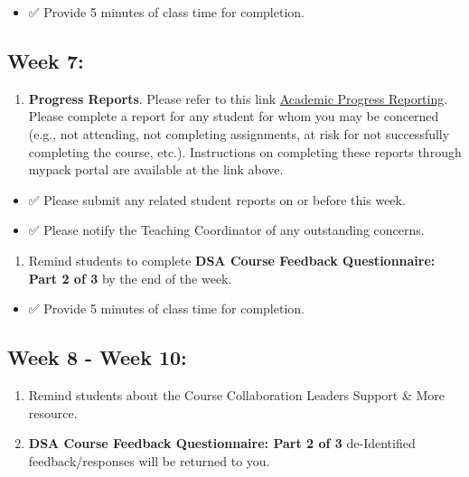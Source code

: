 \documentclass[
  letterpaper,
  DIV=11,
  numbers=noendperiod]{scrreprt}
\providecommand{\tightlist}{%
  \setlength{\itemsep}{0pt}\setlength{\parskip}{0pt}}
\begin{document}
\begin{itemize}
\tightlist
\item
  ✅ Provide 5 minutes of class time for completion.
\end{itemize}

\subsection{Week 7:}\label{week-7}

\begin{enumerate}
\def\labelenumi{\arabic{enumi})}
\tightlist
\item
  \textbf{Progress Reports}. Please refer to this link
  \href{https://dasa.ncsu.edu/faculty-resources/academic-progress-reporting/}{Academic
  Progress Reporting}. Please complete a report for any student for whom
  you may be concerned (e.g., not attending, not completing assignments,
  at risk for not successfully completing the course, etc.).
  Instructions on completing these reports through mypack portal are
  available at the link above.
\end{enumerate}

\begin{itemize}
\item
  ✅ Please submit any related student reports on or before this week.
\item
  ✅ Please notify the Teaching Coordinator of any outstanding concerns.
\end{itemize}

\begin{enumerate}
\def\labelenumi{\arabic{enumi})}
\setcounter{enumi}{1}
\tightlist
\item
  Remind students to complete \textbf{DSA Course Feedback Questionnaire:
  Part 2 of 3} by the end of the week.
\end{enumerate}

\begin{itemize}
\tightlist
\item
  ✅ Provide 5 minutes of class time for completion.
\end{itemize}

\subsection{Week 8 - Week 10:}\label{week-8---week-10}

\begin{enumerate}
\def\labelenumi{\arabic{enumi})}
\item
  Remind students about the Course Collaboration Leaders Support \& More
  resource.
\item
  \textbf{DSA Course Feedback Questionnaire: Part 2 of 3} de-Identified
  feedback/responses will be returned to you.
\end{enumerate}
\end{document}
